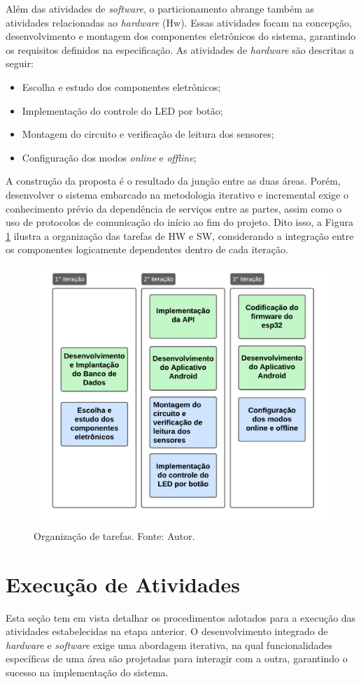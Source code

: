 Além das atividades de \textit{software}, o particionamento abrange também as atividades relacionadas ao \textit{hardware} (Hw). Essas atividades focam na concepção, desenvolvimento e montagem dos componentes 
eletrônicos do sistema, garantindo os requisitos definidos na especificação. As atividades de \textit{hardware} são descritas a seguir:

\begin{itemize}
    \item Escolha e estudo dos componentes eletrônicos;
    \item Implementação do controle do LED por botão;
    \item Montagem do circuito e verificação de leitura dos sensores;
    \item Configuração dos modos \textit{online} e \textit{offline};
\end{itemize}

A construção da proposta é o resultado da junção entre as duas áreas. Porém, desenvolver o sistema embarcado 
na metodologia iterativo e incremental exige o conhecimento prévio da dependência de serviços entre as partes, assim como o uso de protocolos 
de comunicação do início ao fim do projeto. Dito isso, a Figura \ref{figTarefasMetodologia} ilustra a organização das tarefas de HW e SW, considerando 
a integração entre os componentes logicamente dependentes dentro de cada iteração.

\begin{figure}[ht]
    \centering
    \includegraphics[width=.44\textwidth]{img/tarefas-metodologia.png}
    \caption{Organização de tarefas. Fonte: Autor.}\label{figTarefasMetodologia}
\end{figure}

\section{Execução de Atividades}\label{fase4}

Esta seção tem em vista detalhar os procedimentos adotados para a execução das atividades estabelecidas na etapa anterior. O desenvolvimento 
integrado de \textit{hardware} e \textit{software} exige uma abordagem iterativa, na qual funcionalidades específicas de uma área são projetadas para interagir com 
a outra, garantindo o sucesso na implementação do sistema.


